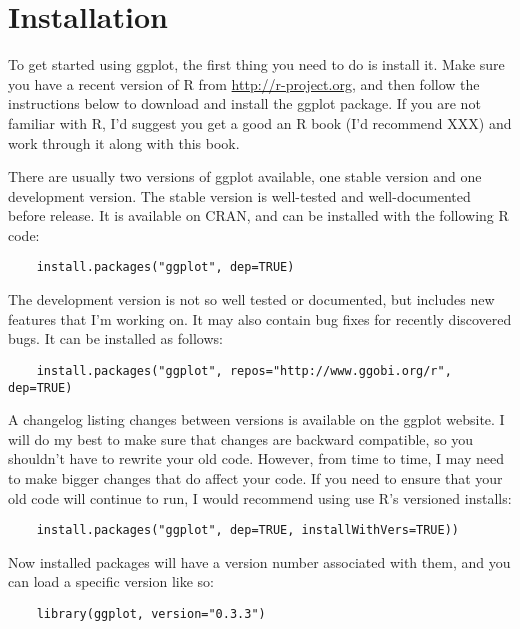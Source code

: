 \section{Installation}\label{sub:installation}

To get started using ggplot, the first thing you need to do is install it.  Make sure you have a recent version of R from \url{http://r-project.org}, and then follow the instructions below to download and install the ggplot package.  If you are not familiar with R, I'd suggest you get a good an R book (I'd recommend XXX) and work through it along with this book.

There are usually two versions of ggplot available, one stable version and one development version. The stable version is well-tested and well-documented before release.  It is available on CRAN, and can be installed with the following R code:

\begin{verbatim}
	install.packages("ggplot", dep=TRUE)
\end{verbatim}

The development version is not so well tested or documented, but includes new features that I'm working on.  It may also contain bug fixes for recently discovered bugs.  It can be installed as follows:

\begin{verbatim}
	install.packages("ggplot", repos="http://www.ggobi.org/r", dep=TRUE)
\end{verbatim}

A changelog listing changes between versions is available on the ggplot website.  I will do my best to make sure that changes are backward compatible, so you shouldn't have to rewrite your old code.  However, from time to time, I may need to make bigger changes that do affect your code.  If you need to ensure that your old code will continue to run, I would recommend using use R's versioned installs:

\begin{verbatim}
	install.packages("ggplot", dep=TRUE, installWithVers=TRUE))
\end{verbatim}

Now installed packages will have a version number associated with them, and you can load a specific version like so:

\begin{verbatim}
	library(ggplot, version="0.3.3")
\end{verbatim}

